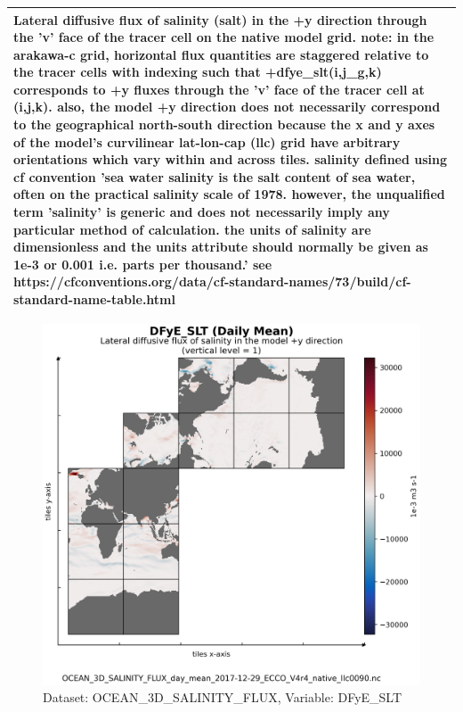 \begin{longtable}{|m{}|m{}|m{}|m{}|}
\multicolumn{4}{|p{1\textwidth}|}{\footnotesize{{Lateral diffusive flux of salinity (salt) in the +y direction through the 'v' face of the tracer cell on the native model grid. note: in the arakawa-c grid, horizontal flux quantities are staggered relative to the tracer cells with indexing such that +dfye\_slt(i,j\_g,k) corresponds to +y fluxes through the 'v' face of the tracer cell at (i,j,k). also, the model +y direction does not necessarily correspond to the geographical north-south direction because the x and y axes of the model's curvilinear lat-lon-cap (llc) grid have arbitrary orientations which vary within and across tiles. salinity defined using cf convention 'sea water salinity is the salt content of sea water, often on the practical salinity scale of 1978. however, the unqualified term 'salinity' is generic and does not necessarily imply any particular method of calculation. the units of salinity are dimensionless and the units attribute should normally be given as 1e-3 or 0.001 i.e. parts per thousand.' see https://cfconventions.org/data/cf-standard-names/73/build/cf-standard-name-table.html}}} \\ \hline
\end{longtable}

\begin{figure}[H]
\centering
\includegraphics[scale=0.55]{../images/plots/v4r4/native_plots/Ocean_Three-Dimensional_Salinity_Fluxes/DFyE_SLT.png}
\caption{Dataset: OCEAN\_3D\_SALINITY\_FLUX, Variable: DFyE\_SLT}
\label{tab:table-OCEAN_3D_SALINITY_FLUX_DFyE_SLT-Plot}
\end{figure}
\newpage
\pagebreak
